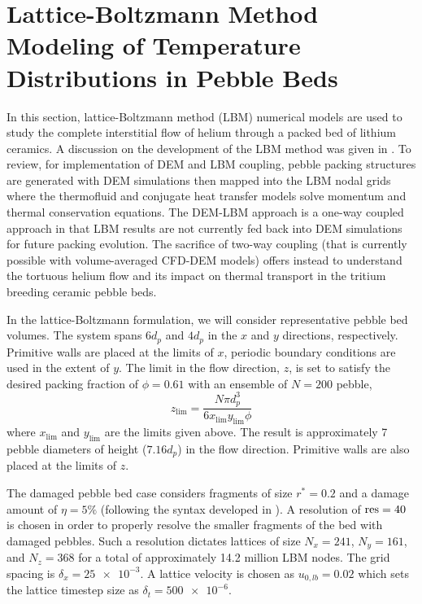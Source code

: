 \FloatBarrier
\section{Lattice-Boltzmann Method Modeling of Temperature Distributions in Pebble Beds}\label{sec:lbm-studies}
In this section, lattice-Boltzmann method (LBM) numerical models are used to study the complete interstitial flow of helium through a packed bed of lithium ceramics. A discussion on the development of the LBM method was given in . To review, for implementation of DEM and LBM coupling, pebble packing structures are generated with DEM simulations then mapped into the LBM nodal grids where the thermofluid and conjugate heat transfer models solve momentum and thermal conservation equations. The DEM-LBM approach is a one-way coupled approach in that LBM results are not currently fed back into DEM simulations for future packing evolution. The sacrifice of two-way coupling (that is currently possible with volume-averaged CFD-DEM models) offers instead to understand the tortuous helium flow and its impact on thermal transport in the tritium breeding ceramic pebble beds.

In the lattice-Boltzmann formulation, we will consider representative pebble bed volumes. The system spans $6d_p$ and $4d_p$ in the $x$ and $y$ directions, respectively. Primitive walls are placed at the limits of $x$, periodic boundary conditions are used in the extent of $y$. The limit in the flow direction, $z$, is set to satisfy the desired packing fraction of $\phi = 0.61$ with an ensemble of $N = 200$ pebble,
\begin{equation}
z_\text{lim} = \frac{N\pi d_p^3}{6x_\text{lim}y_\text{lim}\phi}
\end{equation}
where $x_\text{lim}$ and $y_\text{lim}$ are the limits given above. The result is approximately 7 pebble diameters of height ($7.16 d_p$) in the flow direction. Primitive walls are also placed at the limits of $z$.

The damaged pebble bed case considers fragments of size $r^* = 0.2$ and a damage amount of $\eta = 5\%$ (following the syntax developed in ). A resolution of $\text{res} = 40$ is chosen in order to properly resolve the smaller fragments of the bed with damaged pebbles. Such a resolution dictates lattices of size $N_x = 241$, $N_y = 161$, and $N_z = 368$ for a total of approximately 14.2 million LBM nodes. The grid spacing is $\delta_x = \num{25e-3}$. A lattice velocity is chosen as $u_{0,lb} = 0.02$ which sets the lattice timestep size as $\delta_t = \num{500e-6}$. 

